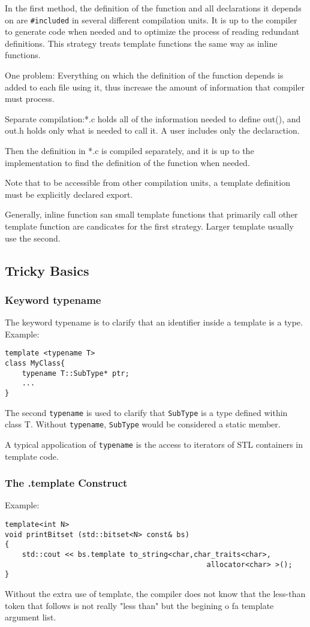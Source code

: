 \documentclass[11pt, a4paper]{book}
\begin{document}
\begin{itemize}
In the first method, the definition of the function and all declarations it depends on are \verb|#included| in several different compilation units. It is up to the compiler to generate code when needed and to optimize the process of reading redundant definitions. This strategy treats template functions the same way as inline functions.

One problem: Everything on which the definition of the function depends is added to each file using it, thus increase the amount of information that compiler must process.

Separate compilation:*.c holds all of the information needed to define out(), and out.h holds only what is needed to call it. A user includes only the declaraction.

Then the definition in *.c is compiled separately, and it is up to the implementation to find the definition of the function when needed.

Note that to be accessible from other compilation units, a template definition must be explicitly declared export.

Generally, inline function san small template functions that primarily call other template function are candicates for the first strategy. Larger template usually use the second.
\subsection{Tricky Basics}
\subsubsection{Keyword typename}
The keyword typename is to clarify that an identifier inside a template is a type. Example:
\begin{verbatim}
template <typename T>
class MyClass{
    typename T::SubType* ptr;
    ...
}
\end{verbatim}
The second \verb|typename| is used to clarify that \verb|SubType| is a type defined within class T. Without \verb|typename|, \verb|SubType| would be considered a static member.

A typical appolication of \verb|typename| is the access to iterators of STL containers in template code.

\subsubsection{The .template Construct}
Example:
\begin{verbatim}
template<int N> 
void printBitset (std::bitset<N> const& bs) 
{ 
    std::cout << bs.template to_string<char,char_traits<char>, 
	                                           allocator<char> >(); 
}
\end{verbatim}
Without the extra use of template, the compiler does not know that the less-than token that follows is not really "less than" but the begining o fa template argument list.

\end{itemize}
\end{document}

